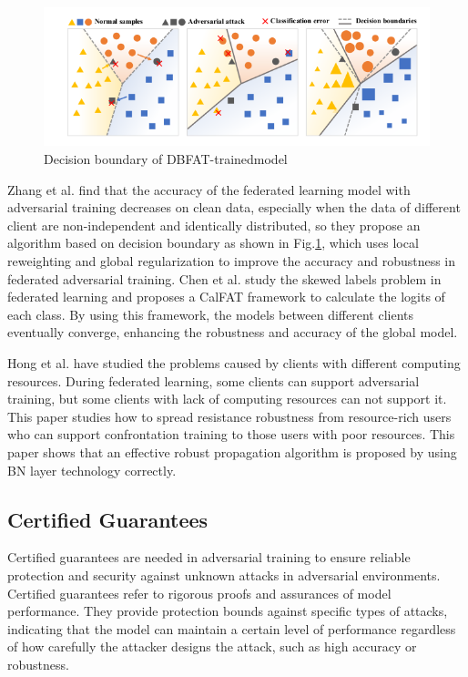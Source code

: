 \documentclass[conference]{IEEEtran}
\begin{document}
\begin{figure}[htbp]
    \centerline{\includegraphics[width=1.0\linewidth,height=0.4\linewidth]{picture/db.png}}
    \caption{Decision boundary of DBFAT-trainedmodel}
    \label{fig19}
\end{figure}

Zhang et al.\cite{b34} find that the accuracy of the federated learning model with
adversarial training decreases on clean data, especially when the data of different
client are non-independent and identically distributed, so they propose an algorithm
based on decision boundary as shown in Fig.\ref{fig19}, which uses local reweighting and global regularization
to improve the accuracy and robustness in federated adversarial training.
Chen et al.\cite{b32} study the skewed labels problem in federated learning and proposes
a CalFAT framework to calculate the logits of each class. By using this framework, the models between different clients eventually converge, 
enhancing the robustness and accuracy of the global model.

Hong et al.\cite{b105} have studied the problems caused by clients with different computing resources.
During federated learning, some clients can support adversarial training, but some clients with
lack of computing resources can not support it. This paper studies how to spread resistance robustness
from resource-rich users who can support confrontation training to those users with poor resources.
This paper shows that an effective robust propagation algorithm is proposed by using BN layer technology correctly.  

\subsection{Certified Guarantees}  
Certified guarantees are needed in adversarial training to ensure reliable protection and security against unknown attacks in adversarial environments.
Certified guarantees refer to rigorous proofs and assurances of model performance. 
They provide protection bounds against specific types of attacks, 
indicating that the model can maintain a certain level of performance regardless of how carefully the attacker designs the attack, such as high accuracy or robustness.
\end{document}
